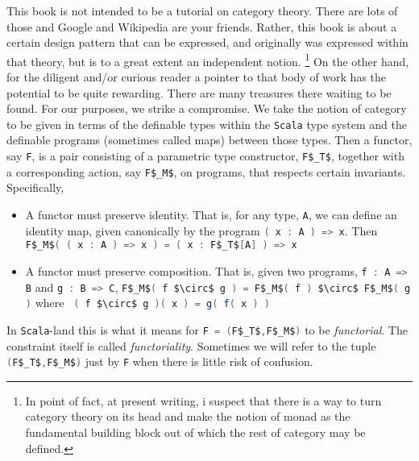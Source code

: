 This book is not intended to be a tutorial on category theory. There
are lots of those and Google and Wikipedia are your friends. Rather,
this book is about a certain design pattern that can be expressed, and
originally was expressed within that theory, but is to a great extent
an independent notion. \footnote{In point of fact, at present writing,
  i suspect that there is a way to turn category theory on its head
  and make the notion of monad as the fundamental building block out
  of which the rest of category may be defined.} On the other hand,
for the diligent and/or curious reader a pointer to that body of work
has the potential to be quite rewarding. There are many treasures
there waiting to be found. For our purposes, we strike a
compromise. We take the notion of category to be given in terms of the
definable types within the \texttt{Scala} type system and the
definable programs (sometimes called maps) between those types. Then a
functor, say \lstinline[language=Scala,mathescape=true]!F!, is a pair
consisting of a parametric type constructor,
\lstinline[language=Scala,mathescape=true]!F$_T$!, together with a
corresponding action, say
\lstinline[language=Scala,mathescape=true]!F$_M$!, on programs, that
respects certain invariants. Specifically,

\begin{itemize}
\item A functor must preserve identity. That is, for any type,
  \lstinline[language=Scala,mathescape=true]!A!, we can define an
  identity map, given canonically by the program
  \lstinline[language=Scala,mathescape=true]!( x : A ) => x!. Then
  \lstinline[language=Scala,mathescape=true]!F$_M$( ( x : A ) => x ) = ( x : F$_T$[A] ) => x!
  \item A functor must preserve composition. That is, given two programs, \lstinline[language=Scala,mathescape=true]!f : A => B! and \lstinline[language=Scala,mathescape=true]!g : B => C!, \lstinline[language=Scala,mathescape=true]!F$_M$( f $\circ$ g ) = F$_M$( f ) $\circ$ F$_M$( g )! where \lstinline[language=Scala,mathescape=true]! ( f $\circ$ g )( x ) = g( f( x ) )!
\end{itemize}

In \texttt{Scala}-land this is what it means for
\lstinline[language=Scala,mathescape=true]!F = (F$_T$,F$_M$)! to be
\emph{functorial}. The constraint itself is called
\emph{functoriality}. Sometimes we will refer to the tuple
\lstinline[language=Scala,mathescape=true]!(F$_T$,F$_M$)! just by
\lstinline[language=Scala,mathescape=true]!F! when there is little
risk of confusion.

